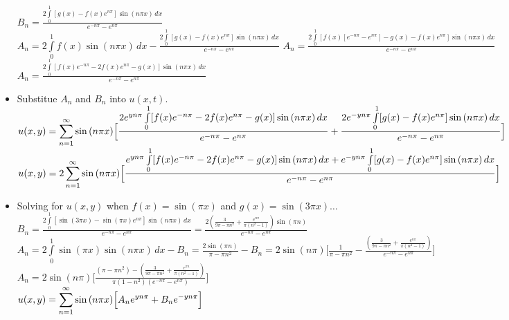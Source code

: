 \documentclass[10pt]{article}
\begin{document}
\begin{itemize}
    \subitem $ \displaystyle  B_{n} = \frac{2 \int \limits_{0}^{1} [g(x) - f(x)e^{n\pi}]\sin{(n\pi x)} \,dx }{e^{-n\pi} - e^{n\pi}} $ \\
    \subitem $ \displaystyle  A_{n} = 2 \int \limits_{0}^{1} f(x)\sin{(n\pi x)} \,dx - \frac{2 \int \limits_{0}^{1} [g(x) - f(x)e^{n\pi}]\sin{(n\pi x)} \,dx }{e^{-n\pi} - e^{n\pi}} $
    \subitem $ \displaystyle  A_{n} = \frac{2 \int \limits_{0}^{1} [f(x)[e^{-n\pi} - e^{n\pi}] - g(x) - f(x)e^{n\pi}]\sin{(n\pi x)} \,dx }{e^{-n\pi} - e^{n\pi}} $ \\
    \subitem $ \displaystyle  A_{n} = \frac{2 \int \limits_{0}^{1} [f(x)e^{-n\pi} - 2f(x)e^{n\pi} - g(x)]\sin{(n\pi x)} \,dx }{e^{-n\pi} - e^{n\pi}} $ \\
    \item Substitue $ A_n $ and $ B_n $ into $ u(x,t) $. \\
    \subitem $ \displaystyle u(x,y) = \sum \limits_{n=1}^{\infty} \sin{(n\pi x)}\Bigl[\frac{2e^{yn\pi } \int \limits_{0}^{1} [f(x)e^{-n\pi} - 2f(x)e^{n\pi} - g(x)]\sin{(n\pi x)} \,dx }{e^{-n\pi} - e^{n\pi}} + \frac{2e^{-yn\pi } \int \limits_{0}^{1} [g(x) - f(x)e^{n\pi}]\sin{(n\pi x)} \,dx }{e^{-n\pi} - e^{n\pi}}\Bigr] $ \\
    \subitem $ \displaystyle u(x,y) = 2\sum \limits_{n=1}^{\infty} \sin{(n\pi x)}\Bigl[\frac{e^{yn\pi } \int \limits_{0}^{1} [f(x)e^{-n\pi} - 2f(x)e^{n\pi} - g(x)]\sin{(n\pi x)} \,dx + e^{-yn\pi } \int \limits_{0}^{1} [g(x) - f(x)e^{n\pi}]\sin{(n\pi x)} \,dx }{e^{-n\pi} - e^{n\pi}}\Bigr] $ \\
    \item Solving for $ u(x,y) $ when $ f(x) = \sin{(\pi x)} $ and $ g(x) = \sin{(3\pi x)} \dots$ \\
    \subitem $ \displaystyle  B_{n} = \frac{2 \int \limits_{0}^{1} [\sin{(3\pi x)} - \sin{(\pi x)}e^{n\pi}]\sin{(n\pi x)} \,dx }{e^{-n\pi} - e^{n\pi}} = \frac{2 \left(\frac{3}{9 \pi -\pi  n^2}+\frac{e^{n\pi}}{\pi  \left(n^2-1\right)}\right) \sin (\pi  n)}{e^{-n\pi}-e^{n\pi}} $ \\
    \subitem $ \displaystyle A_{n} = 2 \int \limits_{0}^{1} \sin{(\pi x)} \sin{(n\pi x)} \,dx - B_{n} = \frac{2 \sin (\pi  n)}{\pi -\pi  n^2} - B_n = 2\sin{(n\pi)} \Biggl[ \frac{1}{\pi -\pi  n^2} - \frac{ \left(\frac{3}{9 \pi -\pi  n^2}+\frac{e^{n\pi}}{\pi  \left(n^2-1\right)}\right)}{e^{-n\pi}-e^{n\pi}} \Biggr] $ \\
    \subitem $ \displaystyle A_{n} = 2\sin{(n\pi)} \Biggl[ \frac{(\pi -\pi  n^2) - \left(\frac{3}{9 \pi -\pi  n^2}+\frac{e^{\pi  n}}{\pi  \left(n^2-1\right)}\right)}{\pi(1 - n^2)(e^{-n\pi}-e^{n\pi})} \Biggr] $ \\
    \subitem $ \displaystyle u(x,y) = \sum \limits_{n=1}^{\infty} \sin{(n\pi x)}\Bigl[A_{n}e^{yn\pi } + B_{n}e^{-yn\pi }\Bigr] $ \\
\end{itemize}
\end{document}
